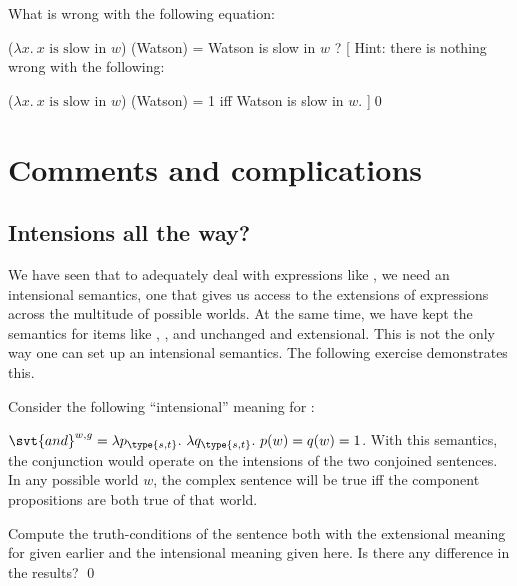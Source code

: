 \begin{exercise}\label{exercise:meta}%
%
  What is wrong with the following equation:

	\ex[belowexskip=6pt] ($\lambda x.\ x \mbox{ is slow in } w$) (Watson) =
  Watson is slow in $w$ ? \xe
\enlargethispage{18pt}%
	[ Hint: there is nothing wrong with the following:

	\ex[aboveexskip=3pt] ($\lambda x.\ x \mbox{ is slow in } w$) (Watson) = 1 iff
  Watson is slow in $w$. ]\qed\xe 
\end{exercise}

\section{Comments and complications} \label{sec:comm-compl}

\subsection{Intensions all the way?} \label{sec:intensions-all-way}

We have seen that to adequately deal with expressions like , we need an intensional semantics, one that gives us
access to the extensions of expressions across the multitude of possible worlds.
At the same time, we have kept the semantics for items like ,
, and  unchanged and extensional. This is not
the only way one can set up an intensional semantics. The following exercise
demonstrates this.
\begin{exercise}
	
  Consider the following ``intensional'' meaning for :
	
  \ex
  $\svt{and}^{w,g} = \lambda p_{\type{s,t}}.\ \lambda
  q_{\type{s,t}}.\ p(w) = q(w) = 1$.
  \xe
  With this semantics, the conjunction  would operate on the
  intensions of the two conjoined sentences. In any possible world $w$, the
  complex sentence will be true iff the component propositions are both true of
  that world.
	
  Compute the truth-conditions of the sentence  both with the
  extensional meaning for  given earlier and the intensional
  meaning given here. Is there any difference in the results? \qed
\end{exercise}

